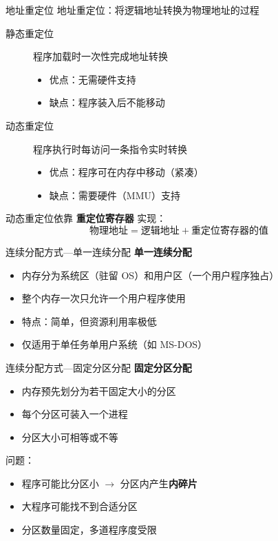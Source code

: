 \documentclass[10pt, aspectratio=169]{beamer}
\begin{document}
\begin{frame}{地址重定位}
    地址重定位：将逻辑地址转换为物理地址的过程
    \vspace{0.5em}
    \begin{description}
        \item[静态重定位] 程序加载时一次性完成地址转换
            \begin{itemize}
                \item 优点：无需硬件支持
                \item 缺点：程序装入后不能移动
            \end{itemize}
        \item[动态重定位] 程序执行时每访问一条指令实时转换
            \begin{itemize}
                \item 优点：程序可在内存中移动（紧凑）
                \item 缺点：需要硬件（MMU）支持
            \end{itemize}
    \end{description}
    \vspace{0.5em}
    动态重定位依靠 \textbf{重定位寄存器} 实现：
    \[
    \text{物理地址} = \text{逻辑地址} + \text{重定位寄存器的值}
    \]
\end{frame}

\begin{frame}{连续分配方式---单一连续分配}
    \textbf{单一连续分配}
    \begin{itemize}
        \item 内存分为系统区（驻留 OS）和用户区（一个用户程序独占）
        \item 整个内存一次只允许一个用户程序使用
        \item 特点：简单，但资源利用率极低
        \item 仅适用于单任务单用户系统（如 MS-DOS）
    \end{itemize}
\end{frame}

\begin{frame}{连续分配方式---固定分区分配}
    \textbf{固定分区分配}
    \begin{itemize}
        \item 内存预先划分为若干固定大小的分区
        \item 每个分区可装入一个进程
        \item 分区大小可相等或不等
    \end{itemize}
    \vspace{0.5em}
    问题：
    \begin{itemize}
        \item 程序可能比分区小 $\rightarrow$ 分区内产生\textbf{内碎片}
        \item 大程序可能找不到合适分区
        \item 分区数量固定，多道程序度受限
    \end{itemize}
\end{frame}
\end{document}

